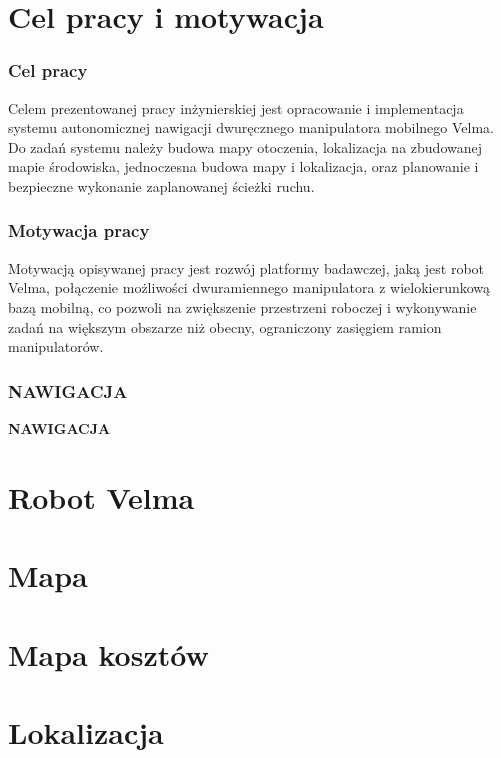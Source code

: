 \documentclass[aspectratio=169,11pt]{beamer}
\begin{document}
\section{Cel pracy i motywacja}
\begin{frame}
\frametitle{Cel pracy}
	Celem prezentowanej pracy inżynierskiej jest opracowanie i implementacja systemu autonomicznej nawigacji dwuręcznego manipulatora mobilnego Velma.
	Do zadań systemu należy budowa mapy otoczenia, lokalizacja na zbudowanej mapie środowiska, jednoczesna budowa mapy i lokalizacja, oraz planowanie i bezpieczne wykonanie zaplanowanej ścieżki ruchu.

	
\end{frame}



\begin{frame}
\frametitle{Motywacja pracy}
Motywacją opisywanej pracy jest rozwój platformy badawczej, jaką jest robot Velma, połączenie możliwości dwuramiennego manipulatora z wielokierunkową bazą mobilną, co pozwoli na zwiększenie przestrzeni roboczej i wykonywanie zadań na większym obszarze niż obecny, ograniczony zasięgiem ramion manipulatorów.
\end{frame}

{
\begin{frame}
\frametitle{NAWIGACJA}
	\begin{center}
		\LARGE{\textbf{NAWIGACJA}}
	\end{center}
\end{frame}
}

\section{Robot Velma}


\section{Mapa}


\section{Mapa kosztów}


\section{Lokalizacja}

\end{document}
